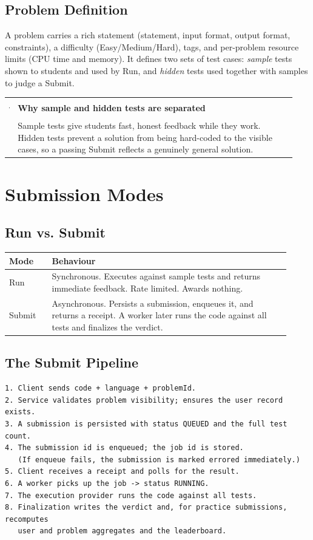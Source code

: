 \documentclass[12pt,a4paper,oneside]{report}
\makeatletter
\newenvironment{callout}[1]{\par\vspace{4pt}\noindent
  \begin{tabular}{@{}p{0.014\linewidth}@{\hspace{0.6em}}p{0.93\linewidth}@{}}
  \textcolor{boxframe}{\rule{2pt}{\baselineskip}} & \textbf{\textcolor{tcetblue}{#1}}\\[2pt] & }{\end{tabular}\par\vspace{6pt}}
\makeatother
\begin{document}
\section{Problem Definition}
A problem carries a rich statement (statement, input format, output format,
constraints), a difficulty (Easy/Medium/Hard), tags, and per-problem resource
limits (CPU time and memory). It defines two sets of test cases: \emph{sample}
tests shown to students and used by Run, and \emph{hidden} tests used together
with samples to judge a Submit.

\begin{callout}{Why sample and hidden tests are separated}
Sample tests give students fast, honest feedback while they work. Hidden tests
prevent a solution from being hard-coded to the visible cases, so a passing
Submit reflects a genuinely general solution.
\end{callout}

\chapter{Submission Modes}
\section{Run vs. Submit}
\begin{longtable}{@{}p{0.14\linewidth} p{0.78\linewidth}@{}}
\toprule
\textbf{Mode} & \textbf{Behaviour}\\
\midrule
\endhead
Run & Synchronous. Executes against sample tests and returns immediate feedback. Rate limited. Awards nothing.\\
Submit & Asynchronous. Persists a submission, enqueues it, and returns a receipt. A worker later runs the code against all tests and finalizes the verdict.\\
\bottomrule
\end{longtable}

\section{The Submit Pipeline}
\begin{lstlisting}[language={}]
1. Client sends code + language + problemId.
2. Service validates problem visibility; ensures the user record exists.
3. A submission is persisted with status QUEUED and the full test count.
4. The submission id is enqueued; the job id is stored.
   (If enqueue fails, the submission is marked errored immediately.)
5. Client receives a receipt and polls for the result.
6. A worker picks up the job -> status RUNNING.
7. The execution provider runs the code against all tests.
8. Finalization writes the verdict and, for practice submissions, recomputes
   user and problem aggregates and the leaderboard.
\end{lstlisting}
\end{document}
